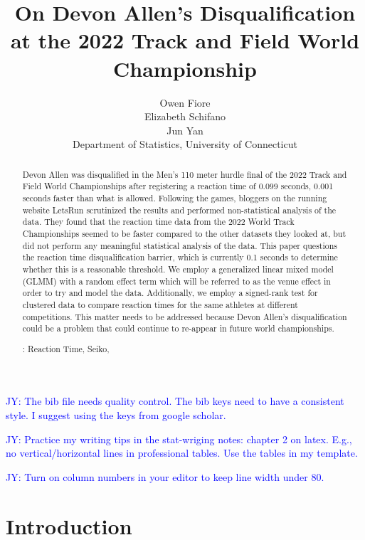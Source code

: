 \documentclass[12pt, letterpaper, titlepage]{article}
\title{On Devon Allen's Disqualification at the 2022 Track and Field World
Championship}
\author{Owen Fiore\\
  Elizabeth Schifano\\
  Jun Yan\\[1ex]
  Department of Statistics, University of Connecticut\\
}
\date{}
\newcommand{\jy}[1]{\textcolor{blue}{JY: #1}}
\begin{document}
\maketitle

\begin{abstract}
  Devon Allen was disqualified in the Men's 110 meter hurdle final of the 2022
  Track and Field World Championships after registering a reaction time of 0.099 seconds, 0.001 
  seconds faster than what is allowed.  Following the games, bloggers on the running website 
  LetsRun scrutinized the results and performed non-statistical analysis of the data.
  They found that the reaction time data from the 2022 World Track Championships seemed to be faster 
  compared to the other datasets they looked at, but did not perform any meaningful statistical 
  analysis of the data.  This paper questions the reaction time disqualification barrier, which is
  currently 0.1 seconds to determine whether this is a reasonable threshold.
  We employ a generalized linear mixed model (GLMM) with a random effect term
  which will be referred to as the venue effect in order to try and model the
  data.  Additionally, we employ a signed-rank test for clustered data to compare
  reaction times for the same athletes at different competitions.
  This matter needs to be addressed because Devon Allen's disqualification could 
  be a problem that could continue to re-appear in future world championships.

\bigskip
{}:
Reaction Time, Seiko, 

\end{abstract}

\doublespace

\jy{The bib file needs quality control. The bib keys need to have a consistent
  style. I suggest using the keys from google scholar.}

\jy{Practice my writing tips in the stat-wriging notes: chapter 2 on
  latex. E.g., no vertical/horizontal lines in professional tables. Use the
  tables in my template.}

\jy{Turn on column numbers in your editor to keep line width under 80.}

\section{Introduction}
\label{sec:intro}
\end{document}
